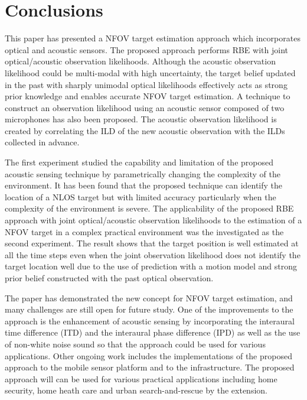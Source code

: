 \section{Conclusions}
\label{sec:conclusions}
This paper has presented a NFOV target estimation approach which incorporates optical and acoustic sensors.  The proposed approach performs RBE with joint optical/acoustic observation likelihoods.  Although the acoustic observation likelihood could be multi-modal with high uncertainty, the target belief updated in the past with sharply unimodal optical likelihoods effectively acts as strong prior knowledge and enables accurate NFOV target estimation.  A technique to construct an observation likelihood using an acoustic sensor composed of two microphones has also been proposed.  The acoustic observation likelihood is created by correlating the ILD of the new acoustic observation with the ILDs collected in advance.   

The first experiment studied the capability and limitation of the proposed acoustic sensing technique by parametrically changing the complexity of the environment.  It has been found that the proposed technique can identify the location of a NLOS target but with limited accuracy particularly when the complexity of the environment is severe.  The applicability of the proposed RBE approach with joint optical/acoustic observation likelihoods to the estimation of a NFOV target in a complex practical environment was the investigated as the second experiment.  The result shows that the target position is well estimated at all the time steps even when the joint observation likelihood does not identify the target location well due to the use of prediction with a motion model and strong prior belief constructed with the past optical observation.  

The paper has demonstrated the new concept for NFOV target estimation, and many challenges are still open for future study.  One of the improvements to the approach is the enhancement of acoustic sensing by incorporating the interaural time difference (ITD) and the interaural phase difference (IPD) as well as the use of non-white noise sound so that the approach could be used for various applications.  Other ongoing work includes the implementations of the proposed approach to the mobile sensor platform and to the infrastructure.  The proposed approach will can be used for various practical applications including home security, home heath care and urban search-and-rescue by the extension.  


